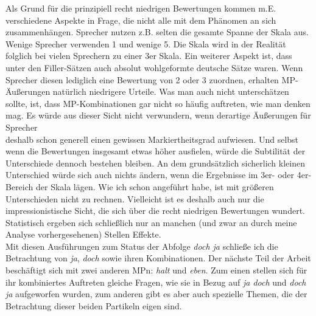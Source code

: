 Als Grund für die prinzipiell recht niedrigen Bewertungen kommen m.E. verschiedene Aspekte in Frage, die nicht alle mit dem Phänomen an sich zusammenhängen. Sprecher nutzen z.B. selten die gesamte Spanne der Skala aus. Wenige Sprecher verwenden 1 und wenige 5. Die Skala wird in der Realität folglich bei vielen Sprechern zu einer 3er Skala. Ein weiterer Aspekt ist, dass unter den Filler-Sätzen auch absolut wohlgeformte deutsche Sätze waren. Wenn Sprecher diesen lediglich eine Bewertung von 2 oder 3 zuordnen, erhalten MP-Äußerungen natürlich niedrigere Urteile. Was man auch nicht unterschätzen sollte, ist, dass MP-Kombinationen gar nicht so häufig auftreten, wie man denken mag. Es würde aus dieser Sicht nicht verwundern, wenn derartige Äußerungen für Sprecher \\ deshalb schon generell einen gewissen Markiertheitsgrad  aufwiesen. Und selbst wenn die Bewertungen insgesamt etwas höher ausfielen, würde die Subtilität der Unterschiede dennoch bestehen bleiben. An dem grundsätzlich sicherlich kleinen Unterschied würde sich auch nichts ändern, wenn die Ergebnisse im 3er- oder 4er-Bereich der Skala lägen. Wie ich schon angeführt habe, ist mit größeren Unterschieden nicht zu rechnen. Vielleicht ist es deshalb auch nur die impressionistische Sicht, die sich über die recht niedrigen Bewertungen wundert. Statistisch ergeben sich schließlich nur an manchen (und zwar an durch meine Analyse vorhergesehenen) Stellen Effekte.\\

\noindent
Mit diesen Ausführungen zum Status der Abfolge \textit{doch ja} schließe ich die Betrachtung von \textit{ja}, \textit{doch} sowie ihren Kombinationen. Der nächs\-te Teil der Arbeit beschäftigt sich mit zwei anderen MPn: \textit{halt} und \textit{eben}. Zum einen stellen sich für ihr kombiniertes Auftreten gleiche Fragen, wie sie in Bezug auf \textit{ja doch} und \textit{doch ja} aufgeworfen wurden, zum anderen gibt es aber auch spezielle Themen, die der Betrachtung dieser beiden Partikeln eigen sind.

